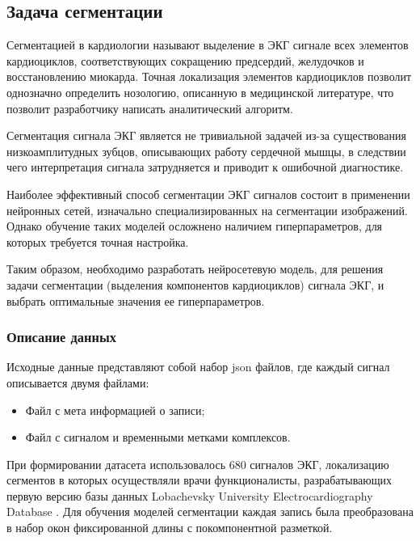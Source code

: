 \documentclass[11pt, oneside, a4paper]{article}
\begin{document}
\subsection{Задача сегментации}

Сегментацией в кардиологии называют выделение в ЭКГ сигнале всех элементов кардиоциклов, соответствующих сокращению предсердий, желудочков и восстановлению миокарда. Точная локализация элементов кардиоциклов позволит однозначно определить нозологию, описанную в медицинской литературе, что позволит разработчику написать аналитический алгоритм.

Сегментация сигнала ЭКГ является не тривиальной задачей из-за существования низкоамплитудных зубцов, описывающих работу сердечной мышцы, в следствии чего интерпретация сигнала затрудняется и приводит к ошибочной диагностике.

Наиболее эффективный способ сегментации ЭКГ сигналов состоит в применении  нейронных сетей, изначально специализированных на сегментации изображений. Однако обучение таких моделей осложнено наличием гиперпараметров, для которых требуется точная настройка.

Таким образом, необходимо разработать нейросетевую модель, для решения задачи сегментации (выделения компонентов кардиоциклов) сигнала ЭКГ, и выбрать оптимальные значения ее гиперпараметров.

\subsubsection{Описание данных}
Исходные данные представляют собой набор json файлов, где каждый сигнал описывается двумя файлами: 
\begin{itemize}
  \item Файл с мета информацией о записи;
  \item Файл с сигналом и временными метками комплексов.
\end{itemize}
При формировании датасета использовалось 680 сигналов ЭКГ, локализацию сегментов в которых осуществляли врачи функционалисты, разрабатывающих первую версию базы данных Lobachevsky University Electrocardiography Database \cite{Kalyakulina2020}. Для обучения моделей сегментации каждая запись была преобразована в набор окон фиксированной длины с покомпонентной разметкой.
\end{document}
